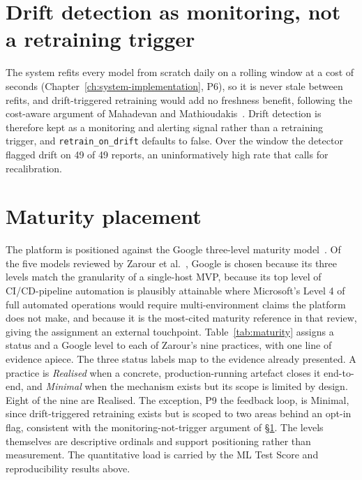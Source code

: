 \section{Drift detection as monitoring, not a retraining trigger}
\label{sec:res-drift}

The system refits every model from scratch daily on a rolling window at a cost of
seconds (Chapter~\ref{ch:system-implementation}, P6), so it is never stale between
refits, and drift-triggered retraining would add no freshness benefit,
following the cost-aware argument of Mahadevan and
Mathioudakis~\cite{mahadevan2024costaware}. Drift detection is therefore kept as a
monitoring and alerting signal rather than a retraining trigger, and
\texttt{retrain\_on\_drift} defaults to false. Over the window the detector
flagged drift on 49 of 49 reports, an uninformatively high rate that calls for
recalibration.

\section{Maturity placement}
\label{sec:res-maturity}

The platform is positioned against the Google three-level maturity
model~\cite{google_mlops_maturity}. Of the five models reviewed by Zarour et
al.~\cite{zarour2025}, Google is chosen because its three levels match the
granularity of a single-host MVP, because its top level of CI/CD-pipeline
automation is plausibly attainable where Microsoft's Level 4 of full automated
operations would require multi-environment claims the platform does not make, and
because it is the most-cited maturity reference in that review, giving the
assignment an external touchpoint. Table~\ref{tab:maturity} assigns a status and
a Google level to each of Zarour's nine practices, with one line of evidence
apiece. The three status labels map to the evidence already presented. A practice
is \emph{Realised} when a concrete, production-running artefact closes it
end-to-end, and \emph{Minimal} when the mechanism exists but its scope is
limited by design. Eight of the nine are Realised. The exception, P9 the feedback
loop, is Minimal, since drift-triggered retraining exists but is scoped to two
areas behind an opt-in flag, consistent with the monitoring-not-trigger argument
of \S\ref{sec:res-drift}. The levels themselves are descriptive ordinals and
support positioning rather than measurement. The quantitative load is carried by
the ML Test Score and reproducibility results above.

